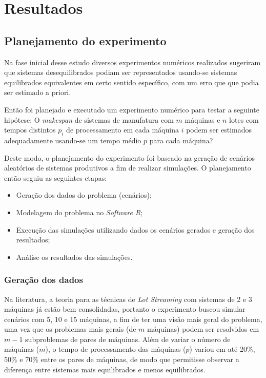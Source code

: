 \section{Resultados} \label{sec:result}
\subsection{Planejamento do experimento} \label{subsec:planexp}

Na fase inicial desse estudo diversos experimentos numéricos realizados  sugeriram que sistemas desequilibrados podiam ser representados usando-se sistemas equilibrados equivalentes em certo sentido específico, com um erro que que podia ser estimado a priori. 
    
Então foi planejado e executado um experimento numérico para testar a seguinte hipótese: O \textit{makespan} de sistemas de manufatura com $m$ máquinas e $n$ lotes com tempos distintos $p_i$ de processamento em cada máquina $i$ podem ser estimados adequadamente usando-se um tempo médio $p$ para cada máquina?

Deste modo, o planejamento do experimento foi baseado na geração de cenários aleatórios de sistemas produtivos a fim de realizar simulações. O planejamento então seguiu as seguintes etapas:

\begin{itemize}
    \item Geração dos dados do problema (cenários);
    \item Modelagem do problema no \textit{Software R};
    \item Execução das simulações utilizando dados os cenários gerados e geração dos resultados;
    \item Análise os resultados das simulações.
\end{itemize}


    \subsubsection{Geração dos dados}
    
    Na literatura, a teoria para as técnicas de \textit{Lot Streaming} com sistemas de 2 e 3 máquinas já estão bem consolidadas, portanto o experimento buscou simular cenários com 5, 10 e 15 máquinas, a fim de ter uma visão mais geral do problema, uma vez que os problemas mais gerais (de $m$ máquinas) podem ser resolvidos em $m-1$ subproblemas de pares de máquinas. Além de variar o número de máquinas ($m$), o tempo de processamento das máquinas ($p$) variou em até 20\%, 50\% e 70\% entre os pares de máquinas, de modo que permitisse observar a diferença entre sistemas mais equilibrados e menos equilibrados. 
    
